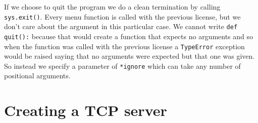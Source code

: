 If we choose to quit the program we do a clean termination by calling \verb|sys.exit()|.
Every menu function is called with the previous license, but we don’t care about the argument in this particular case.
We cannot write \verb|def quit():| because that would create a function that expects no arguments and so when the function was called with the previous license a \verb|TypeError| exception would be raised saying that no arguments were expected but that one was given.
So instead we specify a parameter of \verb|*ignore| which can take any number of positional arguments.




\section{Creating a TCP server}

